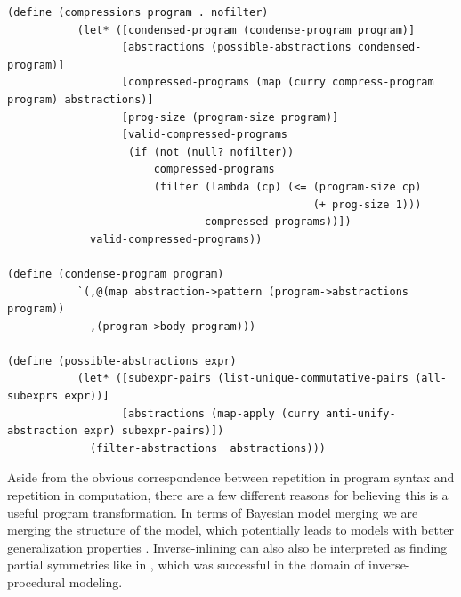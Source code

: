 \documentclass[a4paper,10pt]{article}
\begin{document}
\begin{lstlisting}[frame=trBL]
(define (compressions program . nofilter)
           (let* ([condensed-program (condense-program program)]
                  [abstractions (possible-abstractions condensed-program)]
                  [compressed-programs (map (curry compress-program program) abstractions)]
                  [prog-size (program-size program)]
                  [valid-compressed-programs
                   (if (not (null? nofilter))
                       compressed-programs
                       (filter (lambda (cp) (<= (program-size cp)
                                                (+ prog-size 1)))
                               compressed-programs))])
             valid-compressed-programs))

(define (condense-program program)
           `(,@(map abstraction->pattern (program->abstractions program))
             ,(program->body program)))

(define (possible-abstractions expr)
           (let* ([subexpr-pairs (list-unique-commutative-pairs (all-subexprs expr))]
                  [abstractions (map-apply (curry anti-unify-abstraction expr) subexpr-pairs)])
             (filter-abstractions  abstractions)))
\end{lstlisting}

Aside from the obvious correspondence between repetition in program syntax and repetition in computation, there are a few different reasons for believing this is a useful program transformation.  In terms of Bayesian model merging we are merging the structure of the model, which potentially leads to models with better generalization properties \cite{Stolcke:1994:IPG:645515.658235}.  Inverse-inlining can also also be interpreted as finding partial symmetries like in \cite{DBLP:journals/tog/BokelohWS10}, which was successful in the domain of inverse-procedural modeling.
\end{document}
